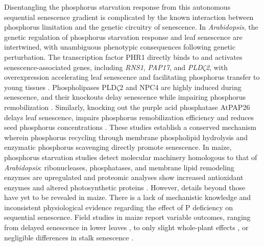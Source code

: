 \documentclass[9pt,twocolumn,twoside]{rilabRxiv}
\begin{document}
Disentangling the phosphorus starvation response from this autonomous sequential senescence gradient is complicated by the known interaction between phosphorus limitation and the genetic circuitry of senescence.
In \textit{Arabidopsis}, the genetic regulation of phosphorus starvation response and leaf senescence are intertwined, with unambiguous phenotypic consequences following genetic perturbation.
The transcription factor PHR1 directly binds to and activates senescence-associated genes, including \textit{RNS1}, \textit{PAP17}, and \textit{PLD$\zeta$2}, with overexpression accelerating leaf senescence and facilitating phosphorus transfer to young tissues \cite{zhang2024}.
Phospholipases PLD$\zeta$2 and NPC4 are highly induced during senescence, and their knockouts delay senescence while impairing phosphorus remobilization \cite{yang2024}.
Similarly, knocking out the purple acid phosphatase AtPAP26 delays leaf senescence, impairs phosphorus remobilization efficiency and reduces seed phosphorus concentrations \cite{robinson2012}.
These studies establish a conserved mechanism wherein phosphorus recycling through membrane phospholipid hydrolysis and enzymatic phosphorus scavenging directly promote senescence.
In maize, phosphorus starvation studies detect molecular machinery homologous to that of \textit{Arabidopsis}: ribonucleases, phosphatases, and membrane lipid remodeling enzymes \cite{zhang2014c,torres-rodriguez2024} are upregulated and proteomic analyses show increased antioxidant enzymes and altered photosynthetic proteins \cite{he2022,zhang2014b}.
However, details beyond those have yet to be revealed in maize. 
There is a lack of mechanistic knowledge and inconsistent physiological evidence regarding the effect of P deficiency on sequential senescence.
Field studies in maize report variable outcomes, ranging from delayed senescence in lower leaves \cite{colomb2000}, to only slight whole-plant effects \cite{plenet2000}, or negligible differences in stalk senescence \cite{russo1995}.
\end{document}
